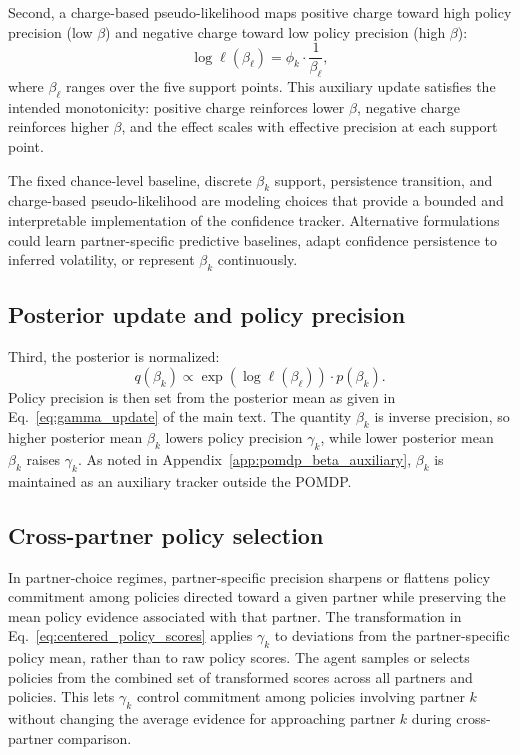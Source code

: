 Second, a charge-based pseudo-likelihood maps positive charge toward high policy precision (low $\beta$) and negative charge toward low policy precision (high $\beta$):
\begin{equation}
\log \ell(\beta_\ell) = \phi_k \cdot \frac{1}{\beta_\ell},
\label{eq:pseudo_lik}
\end{equation}
where $\beta_\ell$ ranges over the five support points. This auxiliary update satisfies the intended monotonicity: positive charge reinforces lower $\beta$, negative charge reinforces higher $\beta$, and the effect scales with effective precision at each support point.

The fixed chance-level baseline, discrete $\beta_k$ support, persistence transition, and charge-based pseudo-likelihood are modeling choices that provide a bounded and interpretable implementation of the confidence tracker. Alternative formulations could learn partner-specific predictive baselines, adapt confidence persistence to inferred volatility, or represent $\beta_k$ continuously.

\subsection{Posterior update and policy precision}

Third, the posterior is normalized:
\begin{equation}
q(\beta_k) \propto \exp(\log \ell(\beta_\ell)) \cdot p(\beta_k).
\label{eq:posterior_update}
\end{equation}
Policy precision is then set from the posterior mean as given in Eq.~\eqref{eq:gamma_update} of the main text. The quantity $\beta_k$ is inverse precision, so higher posterior mean $\beta_k$ lowers policy precision $\gamma_k$, while lower posterior mean $\beta_k$ raises $\gamma_k$. As noted in Appendix~\ref{app:pomdp_beta_auxiliary}, $\beta_k$ is maintained as an auxiliary tracker outside the POMDP.

\subsection{Cross-partner policy selection}

In partner-choice regimes, partner-specific precision sharpens or flattens policy commitment among policies directed toward a given partner while preserving the mean policy evidence associated with that partner. The transformation in Eq.~\eqref{eq:centered_policy_scores} applies $\gamma_k$ to deviations from the partner-specific policy mean, rather than to raw policy scores. The agent samples or selects policies from the combined set of transformed scores across all partners and policies. This lets $\gamma_k$ control commitment among policies involving partner $k$ without changing the average evidence for approaching partner $k$ during cross-partner comparison.

